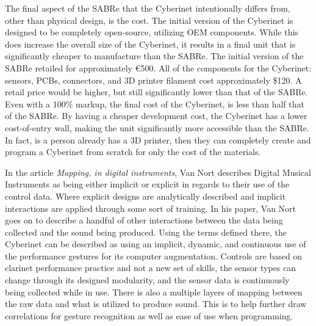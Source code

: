 The final aspect of the SABRe that the Cyberinet intentionally differs from, other than physical design, is the cost. The initial version of the Cyberinet is designed to be completely open-source, utilizing OEM components. While this does increase the overall size of the Cyberinet, it results in a final unit that is significantly cheaper to manufacture than the SABRe. The initial version of the SABRe retailed for approximately €500. All of the components for the Cyberinet: sensors, PCBs, connectors, and 3D printer filament cost approximately \$120. A retail price would be higher, but still significantly lower than that of the SABRe. Even with a 100\% markup, the final cost of the Cyberinet, is less than half that of the SABRe. By having a cheaper development cost, the Cyberinet has a lower cost-of-entry wall, making the unit significantly more accessible than the SABRe. In fact, is a person already has a 3D printer, then they can completely create and program a Cyberinet from scratch for only the cost of the materials.

In the article \textit{Mapping, in digital instruments}\cite{vanNortMapping2007}, Van Nort describes Digital Musical Instruments as being either implicit or explicit in regards to their use of the control data. Where explicit designs are analytically described and implicit interactions are applied through some sort of training\cite{vanNortMapping2007}. In his paper, Van Nort goes on to describe a handful of other interactions between the data being collected and the sound being produced. Using the terms defined there, the Cyberinet can be described as using an implicit, dynamic, and continuous use of the performance gestures for its computer augmentation. Controls are based on clarinet performance practice and not a new set of skills, the sensor types can change through its designed modularity, and the sensor data is continuously being collected while in use. There is also a multiple layers of mapping between the raw data and what is utilized to produce sound. This is to help further draw correlations for gesture recognition as well as ease of use when programming.


